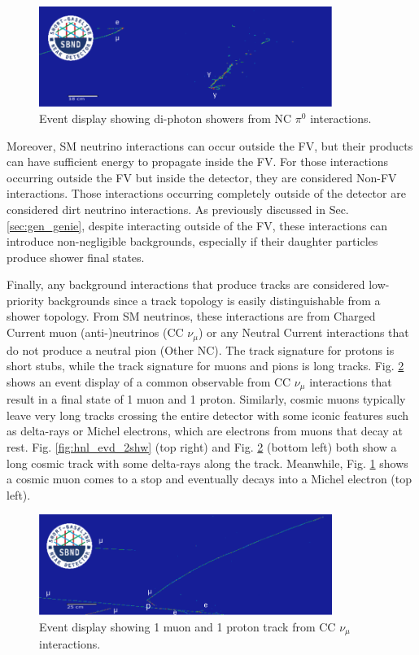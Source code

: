 \begin{figure}[htbp!]
	\centering
        \includegraphics[width=0.85\textwidth]{ncpi0}
        \caption{
		Event display showing di-photon showers from NC $\pi^0$ interactions. 
	}
	\label{fig:ncpi0_evd}
\end{figure}

Moreover, SM neutrino interactions can occur outside the FV, but their products can have sufficient energy to propagate inside the FV.
For those interactions occurring outside the FV but inside the detector, they are considered Non-FV interactions.
Those interactions occurring completely outside of the detector are considered dirt neutrino interactions.
As previously discussed in Sec. \ref{sec:gen_genie}, despite interacting outside of the FV, these interactions can introduce non-negligible backgrounds, especially if their daughter particles produce shower final states. 

Finally, any background interactions that produce tracks are considered low-priority backgrounds since a track topology is easily distinguishable from a shower topology.
From SM neutrinos, these interactions are from Charged Current muon (anti-)neutrinos (CC $\nu_\mu$) or any Neutral Current interactions that do not produce a neutral pion (Other NC).
The track signature for protons is short stubs, while the track signature for muons and pions is long tracks.
Fig. \ref{fig:numu_cos_evd} shows an event display of a common observable from CC $\nu_\mu$ interactions that result in a final state of 1 muon and 1 proton.                                                   
Similarly, cosmic muons typically leave very long tracks crossing the entire detector with some iconic features such as delta-rays or Michel electrons, which are electrons from muons that decay at rest.
Fig. \ref{fig:hnl_evd_2shw} (top right) and Fig. \ref{fig:numu_cos_evd} (bottom left) both show a long cosmic track with some delta-rays along the track.
Meanwhile, Fig. \ref{fig:ncpi0_evd} shows a cosmic muon comes to a stop and eventually decays into a Michel electron (top left).

\begin{figure}[htbp!]
	\centering
        \includegraphics[width=0.85\textwidth]{1m1p_cos}
        \caption{
		Event display showing 1 muon and 1 proton track from CC $\nu_\mu$ interactions. 
	}
	\label{fig:numu_cos_evd}
\end{figure}


